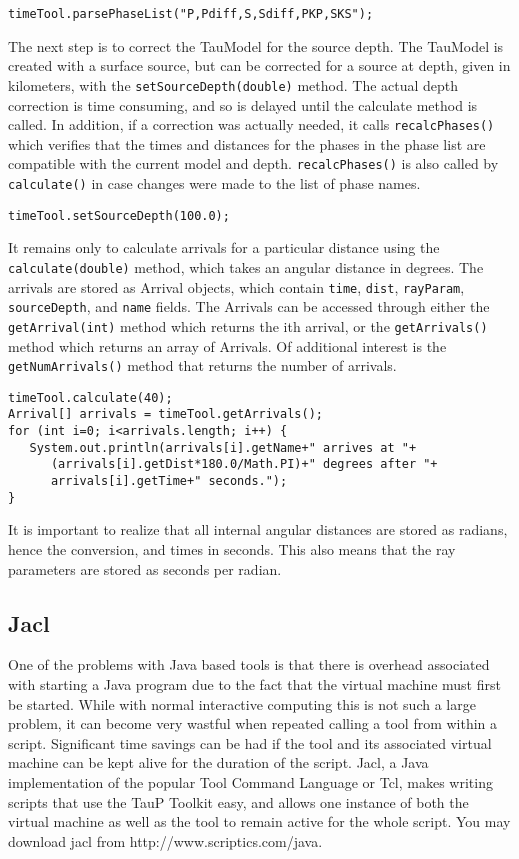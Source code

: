 \texttt{timeTool.parsePhaseList("P,Pdiff,S,Sdiff,PKP,SKS");}

The next step is to correct the TauModel for the source depth. 
The TauModel is created with a surface source, but can be corrected for 
a source at depth, given in kilometers, with the \texttt{setSourceDepth(double)} 
method. The actual depth correction is time consuming, and so is delayed until the calculate method is called. In addition, 
if a correction was actually needed, it
calls \texttt{recalcPhases()} which verifies that the times and distances for 
the phases in the phase list are compatible with the current model and depth. 
\texttt{recalcPhases()} is also called
by \texttt{calculate()} in case changes were made to the list of phase names.

\texttt{timeTool.setSourceDepth(100.0);}

It remains only to calculate arrivals for a particular distance using the 
\texttt{calculate(double)} method, which takes an angular distance in degrees.
The arrivals are stored as Arrival objects, which contain \texttt{time}, 
\texttt{dist}, \texttt{rayParam}, \texttt{sourceDepth}, and \texttt{name} 
fields. The Arrivals can be accessed through either the 
\texttt{getArrival(int)} method which returns the ith arrival, or 
the \texttt{getArrivals()} method which returns an array of Arrivals. 
Of additional interest is the \texttt{getNumArrivals()} method that returns 
the number of arrivals.

\begin{verbatim}
timeTool.calculate(40);
Arrival[] arrivals = timeTool.getArrivals();
for (int i=0; i<arrivals.length; i++) {
   System.out.println(arrivals[i].getName+" arrives at "+
      (arrivals[i].getDist*180.0/Math.PI)+" degrees after "+
      arrivals[i].getTime+" seconds.");
}
\end{verbatim}

It is important to realize that all internal angular distances are 
stored as radians, hence the conversion, and times in seconds. 
This also means that the 
ray parameters are stored as seconds per radian.



\subsection{Jacl}

One of the problems with Java based tools is that there is overhead associated
with starting a Java program due to the fact that the virtual machine must
first be started. While with normal interactive computing this is not such
a large problem, it can become very wastful when repeated calling a tool
from within a script. Significant time savings can be had if the tool
and its associated virtual machine can be kept alive for the duration
of the script.
Jacl, a Java implementation of the popular Tool Command Language or Tcl,
makes writing scripts that use the TauP Toolkit easy, and allows one
instance of both the
virtual machine as well as the tool to remain active for the whole script. 
You may download jacl from http://www.scriptics.com/java.

